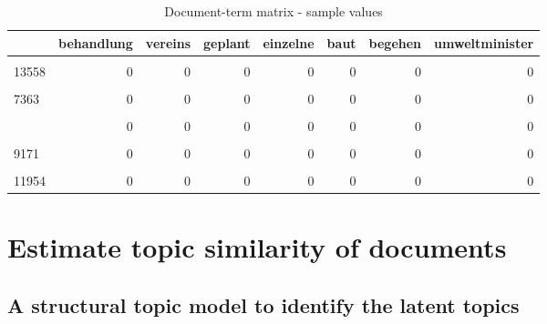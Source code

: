 \documentclass[
]{article}
\begin{document}
\begin{table}[H]

\caption{\label{tab:Document term matrix}Document-term matrix - sample values \label{table:dtm}}
\centering
\fontsize{7}{9}\selectfont
\begin{tabular}[t]{lrrrrrrr}
\toprule
  & behandlung & vereins & geplant & einzelne & baut & begehen & umweltminister\\
\midrule
\cellcolor{gray!6}{7890} & \cellcolor{gray!6}{0} & \cellcolor{gray!6}{0} & \cellcolor{gray!6}{1} & \cellcolor{gray!6}{0} & \cellcolor{gray!6}{0} & \cellcolor{gray!6}{0} & \cellcolor{gray!6}{0}\\
13558 & 0 & 0 & 0 & 0 & 0 & 0 & 0\\
\cellcolor{gray!6}{10093} & \cellcolor{gray!6}{0} & \cellcolor{gray!6}{0} & \cellcolor{gray!6}{0} & \cellcolor{gray!6}{0} & \cellcolor{gray!6}{0} & \cellcolor{gray!6}{0} & \cellcolor{gray!6}{0}\\
7363 & 0 & 0 & 0 & 0 & 0 & 0 & 0\\
\cellcolor{gray!6}{17396} & \cellcolor{gray!6}{0} & \cellcolor{gray!6}{0} & \cellcolor{gray!6}{0} & \cellcolor{gray!6}{0} & \cellcolor{gray!6}{0} & \cellcolor{gray!6}{0} & \cellcolor{gray!6}{0}\\
\addlinespace
5205 & 0 & 0 & 0 & 0 & 0 & 0 & 0\\
\cellcolor{gray!6}{5743} & \cellcolor{gray!6}{0} & \cellcolor{gray!6}{0} & \cellcolor{gray!6}{0} & \cellcolor{gray!6}{0} & \cellcolor{gray!6}{0} & \cellcolor{gray!6}{0} & \cellcolor{gray!6}{0}\\
9171 & 0 & 0 & 0 & 0 & 0 & 0 & 0\\
\cellcolor{gray!6}{1745} & \cellcolor{gray!6}{0} & \cellcolor{gray!6}{0} & \cellcolor{gray!6}{0} & \cellcolor{gray!6}{0} & \cellcolor{gray!6}{0} & \cellcolor{gray!6}{0} & \cellcolor{gray!6}{0}\\
11954 & 0 & 0 & 0 & 0 & 0 & 0 & 0\\
\bottomrule
\end{tabular}
\end{table}

\hypertarget{estimate-topic-similarity-of-documents}{%
\section{Estimate topic similarity of
documents}\label{estimate-topic-similarity-of-documents}}

\hypertarget{a-structural-topic-model-to-identify-the-latent-topics}{%
\subsection{A structural topic model to identify the latent
topics}\label{a-structural-topic-model-to-identify-the-latent-topics}}
\end{document}
